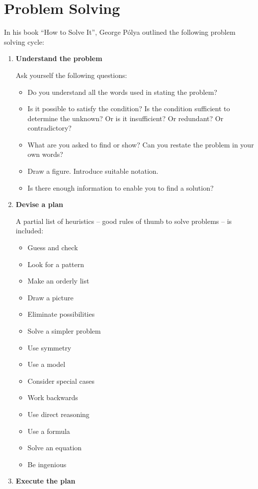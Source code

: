 \documentclass[10pt,a4 paper]{extreport}
\begin{document}
\section*{Problem Solving}
In his book ``How to Solve It'', George P\'{o}lya outlined the following problem solving cycle:
\begin{enumerate}
\item \textbf{Understand the problem}

Ask yourself the following questions:
\begin{itemize}
\item Do you understand all the words used in stating the problem?
\item Is it possible to satisfy the condition? Is the condition sufficient to determine the unknown? Or is it insufficient? Or redundant? Or contradictory?
\item What are you asked to find or show? Can you restate the problem in your own words?
\item Draw a figure. Introduce suitable notation.
\item Is there enough information to enable you to find a solution?
\end{itemize}

\item \textbf{Devise a plan}

A partial list of heuristics -- good rules of thumb to solve problems -- is included:
\begin{itemize}
\item Guess and check
\item Look for a pattern
\item Make an orderly list
\item Draw a picture
\item Eliminate possibilities
\item Solve a simpler problem
\item Use symmetry
\item Use a model
\item Consider special cases
\item Work backwards
\item Use direct reasoning
\item Use a formula
\item Solve an equation
\item Be ingenious
\end{itemize}

\item \textbf{Execute the plan}


\end{enumerate}
\end{document}
